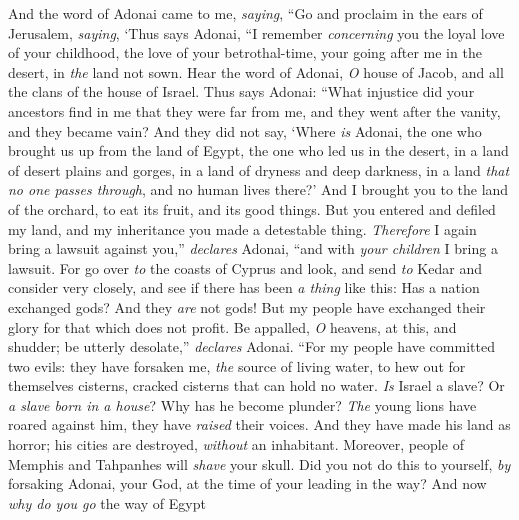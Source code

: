 \begin{biblechapter} %
 And the word of Adonai came to me, \textit{saying},
\verse “Go and proclaim in the ears of Jerusalem, \textit{saying}, ‘Thus says Adonai,
\verse “I remember \textit{concerning} you the loyal love of your childhood, 
the love of your betrothal-time, 
your going after me in the desert, 
in \textit{the} land not sown.
 Hear the word of Adonai, \textit{O} house of Jacob, and all the clans of the house of Israel.
\verse Thus says Adonai:
\verse “What injustice did your ancestors find in me 
that they were far from me, 
and they went after the vanity, 
and they became vain?
\verse And they did not say, 
‘Where \textit{is} Adonai, 
the one who brought us up from the land of Egypt, 
the one who led us in the desert, 
in a land of desert plains and gorges, 
in a land of dryness and deep darkness, 
in a land \textit{that no one passes through}, 
and no human lives there?’
\verse And I brought you to the land of the orchard, 
to eat its fruit, and its good things. 
But you entered and defiled my land, 
and my inheritance you made a detestable thing.
 \textit{Therefore} I again bring a lawsuit against you,” \textit{declares} Adonai, 
“and with \textit{your children} I bring a lawsuit.
\verse For go over \textit{to} the coasts of Cyprus and look, 
and send \textit{to} Kedar and consider very closely, 
and see if there has been \textit{a thing} like this:
\verse Has a nation exchanged gods? And they \textit{are} not gods! 
But my people have exchanged their glory for that which does not profit.
\verse Be appalled, \textit{O} heavens, at this, and shudder; 
be utterly desolate,” \textit{declares} Adonai.
\verse “For my people have committed two evils: 
they have forsaken me, \textit{the} source of living water, 
to hew out for themselves cisterns, cracked cisterns that can hold no water.
\verse \textit{Is} Israel a slave? Or \textit{a slave born in a house}? 
Why has he become plunder?
\verse \textit{The} young lions have roared against him, 
they have \textit{raised} their voices. 
And they have made his land as horror; 
his cities are destroyed, \textit{without} an inhabitant.
\verse Moreover, people of Memphis and Tahpanhes 
will \textit{shave} your skull.
\verse Did you not do this to yourself, 
\textit{by} forsaking Adonai, your God, 
at the time of your leading in the way?
\verse And now \textit{why do you go} the way of Egypt 

\end{biblechapter}
